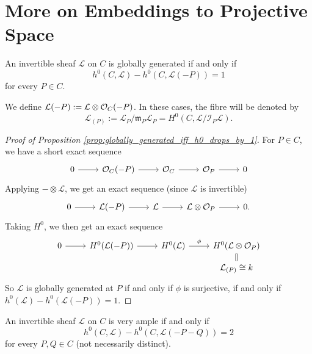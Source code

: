 \section{More on Embeddings to Projective Space}

\begin{prop}\label{prop:globally_generated_iff_h0_drops_by_1}
  An invertible sheaf
  $\mathcal{L}$ on $C$ is globally
  generated if and only if
  \[
    h^0(C, \mathcal{L})
    - h^0(C, \mathcal{L}(-P)) = 1
  \]
  for every $P \in C$.
\end{prop}

\begin{remark}
  We define $\mathcal{L}(-P) := \mathcal{L} \otimes \mathcal{O}_C(-P)$.
  In these cases, the fibre will be denoted by
  \[
    \mathcal{L}_{(P)}
    := \mathcal{L}_P / \mathfrak{m}_P \mathcal{L}_P
    = H^0(C, \mathcal{L} / \mathcal{I}_P \mathcal{L}).
  \]
\end{remark}

\begin{proof}[Proof of Proposition \ref{prop:globally_generated_iff_h0_drops_by_1}]
  For $P \in C$, we have a short exact sequence
  \[
    \begin{tikzcd}
      0 \ar[r] & \OO_C(-P)
      \ar[r] & \OO_C \ar[r] & \OO_P \ar[r] & 0
    \end{tikzcd}
  \]
  Applying $- \otimes \mathcal{L}$, we
  get an exact sequence (since
  $\mathcal{L}$ is invertible)
  \[
    \begin{tikzcd}
      0 \ar[r] & \mathcal{L}(-P)
      \ar[r] & \mathcal{L} \ar[r] & \mathcal{L} \otimes \OO_P
      \ar[r] & 0.
    \end{tikzcd}
  \]
  Taking $H^0$, we then get an exact sequence
  \[
    \begin{tikzcd}[row sep=small]
      0 \ar[r] & H^0(\mathcal{L}(-P)) \ar[r] & H^0(\mathcal{L})
      \ar[r, "\phi"] & H^0(\mathcal{L} \otimes \OO_P) \\
             & & & \mathcal{L}_{(P)} \cong k \ar[u, equal]
    \end{tikzcd}
  \]
  So $\mathcal{L}$ is globally generated
  at $P$
  if and only if $\phi$ is surjective,
  if and only if
  $h^0(\mathcal{L}) - h^0(\mathcal{L}(-P)) = 1$.
\end{proof}

\begin{prop}\label{prop:very_ample_iff_h0_drops_by_2}
  An invertible sheaf $\mathcal{L}$ on $C$
  is very ample if and only if
  \[
    h^0(C, \mathcal{L})
    - h^0(C, \mathcal{L}(-P - Q)) = 2
  \]
  for every $P, Q \in C$ (not necessarily distinct).
\end{prop}

